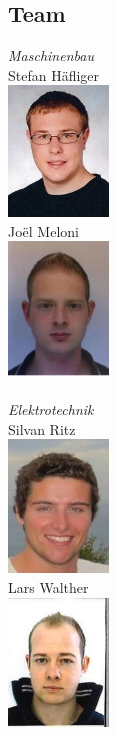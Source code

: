 \subsection{Team}

\begin{minipage}{0.4\textwidth}
\begin{flushleft} \large
\emph{Maschinenbau}\\
Stefan Häfliger\\
\includegraphics[width=0.2\textwidth]{./04_Projektmanagement/fig/stefanhaefliger.jpg}\\
Joël Meloni\\
\includegraphics[width=0.2\textwidth]{./04_Projektmanagement/fig/joelmeloni.jpg}\\
\\

\emph{Elektrotechnik}\\
Silvan Ritz\\
\includegraphics[width=0.2\textwidth]{./04_Projektmanagement/fig/silvanritz.jpg}\\
Lars Walther\\
\includegraphics[width=0.2\textwidth]{./04_Projektmanagement/fig/larswalther.jpg}\\
\end{flushleft}
\end{minipage}


